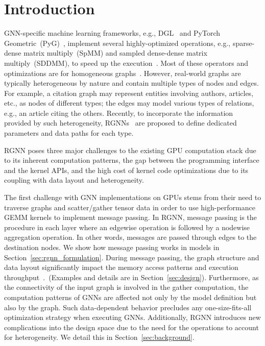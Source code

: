 \section{Introduction}



GNN-specific machine learning frameworks, e.g., DGL~\cite{wang2019deep} and PyTorch Geometric~(PyG)~\cite{fey2019fast}, 
 implement several highly-optimized operations, e.g., sparse-dense matrix multiply~(SpMM) and sampled dense-dense matrix multiply~(SDDMM), to speed up the execution~\cite{huFeatGraphFlexibleEfficient2020a}.
Most of these operators and optimizations are for homogeneous graphs~\cite{huangEfficientSparseMatrix2021,yeSparseTIRComposableAbstractions2022,huFeatGraphFlexibleEfficient2020a}.
However, real-world graphs are typically heterogeneous by nature and contain multiple types of nodes and edges.
For example, a citation graph may represent entities involving authors, articles, etc., as nodes of different types;
the edges may model various types of relations, e.g., an article citing the others.
Recently, to incorporate the information provided by such heterogeneity,
RGNNs~\cite{rgcn,hgt} are proposed to define dedicated parameters and data paths for each type.


RGNN poses {three major} challenges to the existing GPU computation stack due to its inherent computation patterns, the gap between the programming interface and the kernel APIs, and the high cost of kernel code optimizations due to its coupling with data layout and heterogeneity.

The first challenge with GNN implementations on GPUs stems from their need to traverse graphs and {scatter/gather tensor data} in order to use high-performance GEMM kernels to implement message passing.
In RGNN, message passing is the procedure in each layer where an edgewise operation is followed by a nodewise aggregation operation. In other words, messages are passed through edges to the destination nodes. We show how message passing works in models in Section~\ref{sec:rgnn_formulation}.
During message passing, the graph structure and data layout significantly impact the memory access patterns and execution throughput~\cite{wangEmpiricalAnalysisPerformance2021, zhengNatureGraphNeural2021}.~(Examples and details are in Section~\ref{sec:design}).
Furthermore, as the connectivity of the input graph is involved in the {gather} computation, the computation patterns of GNNs are affected not only by the model definition but also by the graph. Such data-dependent behavior precludes any one-size-fits-all optimization strategy when executing GNNs. Additionally, RGNN introduces new complications into the design space due to {the need for the operations to account for heterogeneity. We detail this in Section~\ref{sec:background}.} 


